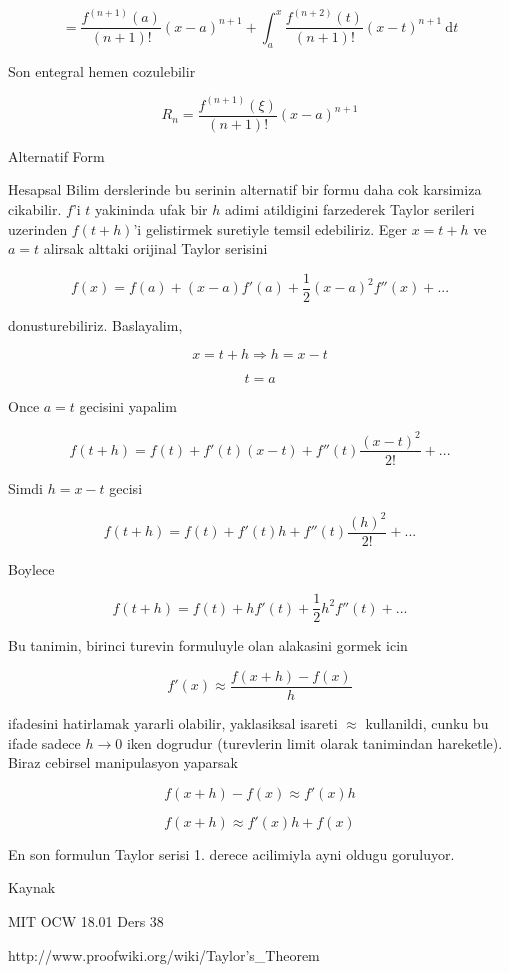 \documentclass[12pt,fleqn]{article}
\begin{document}
\[ = \frac{f^{(n+1)} (a)}{(n+1)!} (x - a)^{n+1} + \int_a^x \frac{f^{(n+2)} \left({t}\right)} {(n+1)!} \left({x - t}\right)^{n+1} \ \mathrm d t \]

Son entegral hemen cozulebilir

\[ R_n = \frac{f^{(n+1)}(\xi)}{(n+1)!} (x-a)^{n+1} \]

Alternatif Form

Hesapsal Bilim derslerinde bu serinin alternatif bir formu daha cok
karsimiza cikabilir. $f$'i $t$ yakininda ufak bir $h$ adimi atildigini
farzederek Taylor serileri uzerinden $f(t+h)$'i gelistirmek suretiyle
temsil edebiliriz. Eger $x = t+h$ ve $a = t$ alirsak alttaki orijinal
Taylor serisini

\[ f(x) = f (a)+(x-a) f'(a) + \frac1 2 (x-a)^2f''(x) + ...\]

donusturebiliriz. Baslayalim,

\[ x = t + h \Rightarrow h = x-t \]

\[ t = a \]

Once $a=t$ gecisini yapalim

\[ f(t+h) = f(t) +  f'(t)(x-t) + f''(t)\frac{(x-t)^2}{2!} + ...\]

Simdi $h = x-t$ gecisi

\[ f(t+h) = f(t) +  f'(t)h + f''(t)\frac{(h)^2}{2!} + ...\]

Boylece

\[ f(t+h) = f (t)+h f'(t) + \frac 1 2 h^2 f''(t) + ...\]

Bu tanimin, birinci turevin formuluyle olan alakasini gormek icin

\[ f'(x) \approx \frac {f(x+h) - f(x)}{h} \]

ifadesini hatirlamak yararli olabilir, yaklasiksal isareti $\approx$
kullanildi, cunku bu ifade sadece $h \to 0$ iken dogrudur (turevlerin limit
olarak tanimindan hareketle). Biraz cebirsel manipulasyon yaparsak

\[ f(x+h) - f(x) \approx f'(x)h  \]

\[ f(x+h)  \approx f'(x)h + f(x) \]

En son formulun Taylor serisi 1. derece acilimiyla ayni oldugu goruluyor. 

Kaynak

MIT OCW 18.01 Ders 38

http://www.proofwiki.org/wiki/Taylor's\_Theorem
\end{document}
